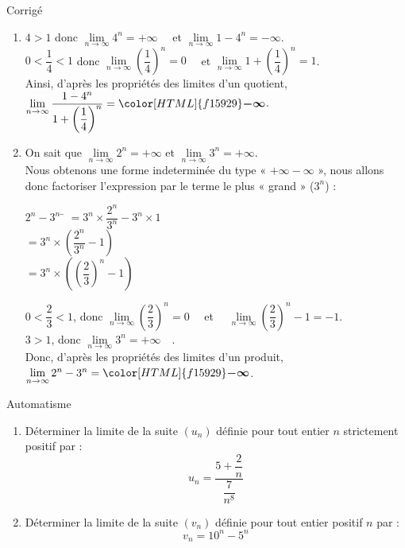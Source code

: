 \documentclass[a4paper,11pt,exos]{nsi} %
\newcounter{autNum}
\newcommand{\aut}[1]
{
	\addtocounter{autNum}{1}
	{\titlefont\color{UGLiBlue}\Large Automatisme\ \theautNum\ \normalsize{#1}}\smallskip	
}
\newcounter{corNum}
\newcommand{\cor}[1]
{
	\addtocounter{corNum}{1}
	{\titlefont\color{UGLiOrange}\Large Corrigé\ \thecorNum\ \normalsize{#1}}\smallskip	
}
\begin{document}
\cor{}
\begin{enumerate}
     \item $4>1$ donc $\lim\limits_{n\to\infty} 4^n=+\infty \quad$  et $\lim\limits_{n\to\infty} 1-4^n=-\infty$.\\
     $0<\dfrac{1}{4}<1$ donc $\lim\limits_{n\to\infty} \left(\dfrac{1}{4}\right)^n=0 \quad$  et $\lim\limits_{n\to\infty} 1+\left(\dfrac{1}{4}\right)^n=1$.\\
     Ainsi, d'après les propriétés des limites d'un quotient, $\lim\limits_{n\to\infty} \dfrac{1-4^n}{1+\left(\dfrac{1}{4}\right)^n}={\color[HTML]{f15929}\boldsymbol{-\infty}}$.
     
     \item On sait que $\lim\limits_{n\to\infty} 2^n=+\infty$ et $\lim\limits_{n\to\infty} 3^n=+\infty$.\\[.5em]
     Nous obtenons une forme indeterminée du type « $+\infty-\infty$ », nous allons donc factoriser l'expression par le terme le plus « grand » ($3^n$) :
     \begin{tabbing}
         $2^n-3^n$    \=  $=3^n\times \dfrac{2^n}{3^n}-3^n\times 1$\\[.5em]
         \>  $=3^n\times \left(\dfrac{2^n}{3^n}-1\right)$\\[.5em]
         \> $=3^n\times \left(\left(\dfrac{2}{3}\right)^n-1\right)$
     \end{tabbing} 
     $0<\dfrac{2}{3}<1$, donc $\lim\limits_{n\to\infty}  \left(\dfrac{2}{3}\right)^n=0\quad$ et $\quad \lim\limits_{n\to\infty}  \left(\dfrac{2}{3}\right)^n-1=-1$.\\[.5em]
     $3>1$, donc $\lim\limits_{n\to\infty} 3^n=+\infty\quad$.\\[.5em]
     Donc, d'après les propriétés des limites d'un produit, $\lim\limits_{n\to\infty} 2^n-3^n={\color[HTML]{f15929}\boldsymbol{-\infty}}$.
\end{enumerate}

\newpage

\aut{}
\begin{enumerate}
		\item Déterminer la limite de la suite $(u_n)$ définie pour tout entier  $n$ strictement positif par : $$u_n=\dfrac{5+\dfrac{2}{n}}{\dfrac{7}{n^8}}$$
		\item Déterminer la limite de la suite $(v_n)$ définie pour tout entier positif $n$ par : $$v_n=10^n-5^n$$
\end{enumerate}
\end{document}
